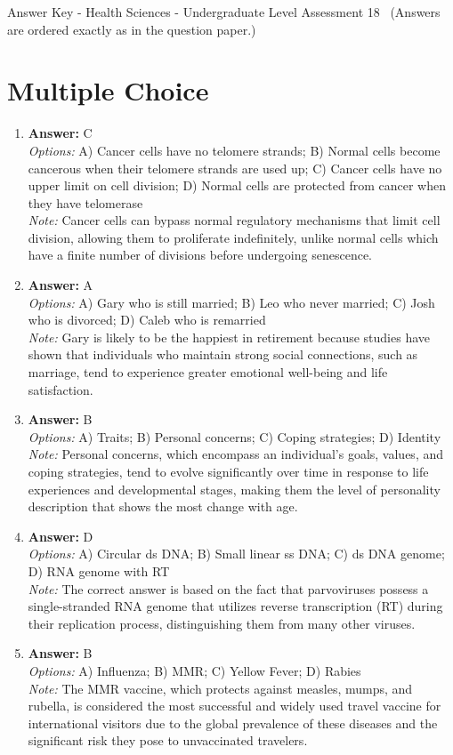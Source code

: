 \documentclass[12pt]{article}
\begin{document}
\begin{center}
Answer Key - Health Sciences - Undergraduate Level Assessment 18 \
\small (Answers are ordered exactly as in the question paper.)
\end{center}

\section*{Multiple Choice}
\begin{enumerate}[label=\arabic*.]
\item \textbf{Answer:} C
\\ \textit{Options:} A) Cancer cells have no telomere strands; B) Normal cells become cancerous when their telomere strands are used up; C) Cancer cells have no upper limit on cell division; D) Normal cells are protected from cancer when they have telomerase
\\ \textit{Note:} Cancer cells can bypass normal regulatory mechanisms that limit cell division, allowing them to proliferate indefinitely, unlike normal cells which have a finite number of divisions before undergoing senescence.
\item \textbf{Answer:} A
\\ \textit{Options:} A) Gary who is still married; B) Leo who never married; C) Josh who is divorced; D) Caleb who is remarried
\\ \textit{Note:} Gary is likely to be the happiest in retirement because studies have shown that individuals who maintain strong social connections, such as marriage, tend to experience greater emotional well-being and life satisfaction.
\item \textbf{Answer:} B
\\ \textit{Options:} A) Traits; B) Personal concerns; C) Coping strategies; D) Identity
\\ \textit{Note:} Personal concerns, which encompass an individual's goals, values, and coping strategies, tend to evolve significantly over time in response to life experiences and developmental stages, making them the level of personality description that shows the most change with age.
\item \textbf{Answer:} D
\\ \textit{Options:} A) Circular ds DNA; B) Small linear ss DNA; C) ds DNA genome; D) RNA genome with RT
\\ \textit{Note:} The correct answer is based on the fact that parvoviruses possess a single-stranded RNA genome that utilizes reverse transcription (RT) during their replication process, distinguishing them from many other viruses.
\item \textbf{Answer:} B
\\ \textit{Options:} A) Influenza; B) MMR; C) Yellow Fever; D) Rabies
\\ \textit{Note:} The MMR vaccine, which protects against measles, mumps, and rubella, is considered the most successful and widely used travel vaccine for international visitors due to the global prevalence of these diseases and the significant risk they pose to unvaccinated travelers.
\end{enumerate}
\end{document}
